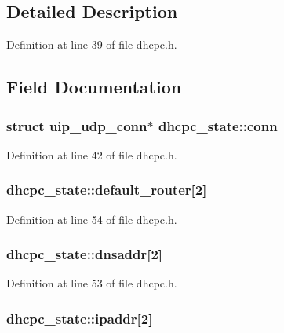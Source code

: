 \subsection{Detailed Description}


Definition at line 39 of file dhcpc.h.



\subsection{Field Documentation}
\hypertarget{structdhcpc__state_acfd36e02c7498d766ff802575e981612}{
\subsubsection[{conn}]{\setlength{\rightskip}{0pt plus 5cm}struct {\bf uip\_\-udp\_\-conn}$\ast$ {\bf dhcpc\_\-state::conn}}}
\label{structdhcpc__state_acfd36e02c7498d766ff802575e981612}


Definition at line 42 of file dhcpc.h.

\hypertarget{structdhcpc__state_a5e16ca335dfd7394527f602da879fca2}{
\subsubsection[{default\_\-router}]{ {\bf dhcpc\_\-state::default\_\-router}\mbox{[}2\mbox{]}}}
\label{structdhcpc__state_a5e16ca335dfd7394527f602da879fca2}


Definition at line 54 of file dhcpc.h.

\hypertarget{structdhcpc__state_a27df2817055bc099821d96eb60a40b34}{
\subsubsection[{dnsaddr}]{ {\bf dhcpc\_\-state::dnsaddr}\mbox{[}2\mbox{]}}}
\label{structdhcpc__state_a27df2817055bc099821d96eb60a40b34}


Definition at line 53 of file dhcpc.h.

\hypertarget{structdhcpc__state_a1d2f2751b0865045486c9aa59d0d0971}{
\subsubsection[{ipaddr}]{ {\bf dhcpc\_\-state::ipaddr}\mbox{[}2\mbox{]}}}
\label{structdhcpc__state_a1d2f2751b0865045486c9aa59d0d0971}



